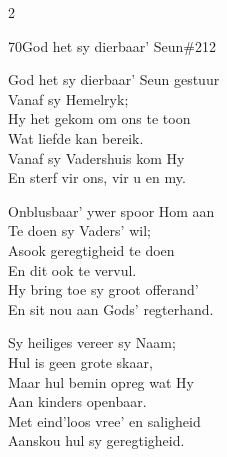 \documentclass{article}
\begin{document}
\begin{multicols}{2}
\begin{hymn}{70}{God het sy dierbaar' Seun}{\#212}
\begin{stanza}
God het sy dierbaar' Seun gestuur\\
Vanaf sy Hemelryk;\\
Hy het gekom om ons te toon\\
Wat liefde kan bereik.\\
Vanaf sy Vadershuis kom Hy\\
En sterf vir ons, vir u en my.
\end{stanza}
\begin{stanza}
Onblusbaar' ywer spoor Hom aan\\
Te doen sy Vaders' wil;\\
Asook geregtigheid te doen\\
En dit ook te vervul.\\
Hy bring toe sy groot offerand'\\
En sit nou aan Gods' regterhand.
\end{stanza}
\begin{stanza}
Sy heiliges vereer sy Naam;\\
Hul is geen grote skaar,\\
Maar hul bemin opreg wat Hy\\
Aan kinders openbaar.\\
Met eind'loos vree' en saligheid\\
Aanskou hul sy geregtigheid.
\end{stanza}
\end{hymn}


\end{multicols}
\end{document}
